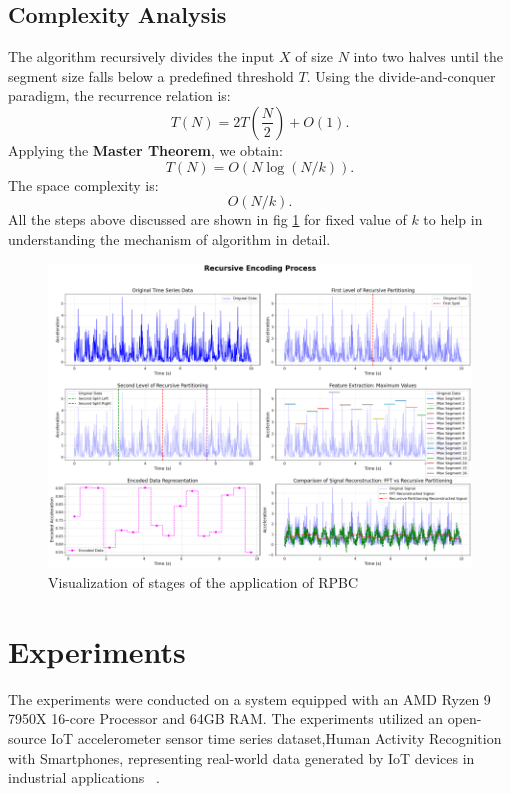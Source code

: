 \documentclass[onecolumn,conference]{IEEEtran}
\begin{document}
\subsection{Complexity Analysis}
The algorithm recursively divides the input \( X \) of size \( N \) into two halves until the segment size falls below a predefined threshold \( T \). Using the divide-and-conquer paradigm, the recurrence relation is:
\[
T(N) = 2T\left(\frac{N}{2}\right) + O(1).
\]
Applying the \textbf{Master Theorem}, we obtain:
\[
T(N) = O(N \log(N / k)).
\]
The space complexity is:
\[
O(N / k).
\]
All the steps above discussed are shown in fig \ref{fig:methodology} for fixed value of $k$ to help in understanding the mechanism of algorithm in detail.
\begin{figure}[!h]
    \centering
    \includegraphics[width=0.9\linewidth, height=0.7\linewidth, keepaspectratio]{images/RPBC methodology.png}
    \caption{Visualization of stages of the application of RPBC}
    \label{fig:methodology}
\end{figure}
\section{Experiments}
The experiments were conducted on a system equipped with an AMD Ryzen 9 7950X 16-core Processor and 64GB RAM. The experiments utilized an open-source IoT accelerometer sensor time series dataset,Human Activity Recognition with Smartphones, representing real-world data generated by IoT devices in industrial applications ~\cite{Anguita2013APD}.
\end{document}
